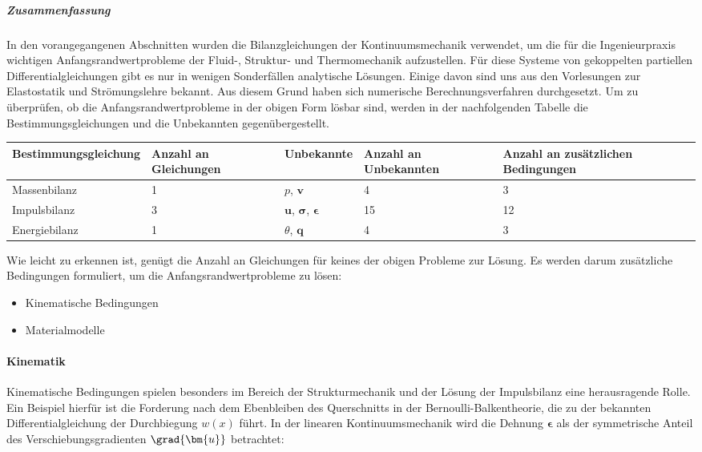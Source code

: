
\subparagraph{Zusammenfassung}

In den vorangegangenen Abschnitten wurden die Bilanzgleichungen der Kontinuumsmechanik verwendet, um die für die Ingenieurpraxis wichtigen Anfangsrandwertprobleme der Fluid-, Struktur- und Thermomechanik aufzustellen. Für diese Systeme von gekoppelten partiellen Differentialgleichungen gibt es nur in wenigen Sonderfällen analytische Lösungen. Einige davon sind uns aus den Vorlesungen zur Elastostatik und Strömungslehre bekannt. Aus diesem Grund haben sich numerische Berechnungsverfahren durchgesetzt. Um zu überprüfen, ob die Anfangsrandwertprobleme in der obigen Form lösbar sind, werden in der nachfolgenden Tabelle die Bestimmungsgleichungen und die Unbekannten gegenübergestellt.

\bigskip\noindent
\begin{tabular}{p{}p{}p{}p{}p{}}
\toprule
Bestimmungsgleichung & Anzahl an Gleichungen & Unbekannte & Anzahl an Unbekannten & Anzahl an zusätzlichen Bedingungen \\
\hline
Massenbilanz & 1 & $p$, $\bm{v}$ & 4 & 3 \\
Impulsbilanz & 3 & $\bm{u}$, $\bm{\sigma}$, $\bm{\epsilon}$ & 15 & 12 \\
Energiebilanz & 1 & $\theta$, $\bm{q}$ & 4 & 3 \\
\bottomrule
\end{tabular}

\bigskip Wie leicht zu erkennen ist, genügt die Anzahl an Gleichungen für keines der obigen Probleme zur Lösung. Es werden darum zusätzliche Bedingungen formuliert, um die Anfangsrandwertprobleme zu lösen:

\begin{itemize}
\item Kinematische Bedingungen
\item Materialmodelle
\end{itemize}


\paragraph{Kinematik}

Kinematische Bedingungen spielen besonders im Bereich der Strukturmechanik und der Lösung der Impulsbilanz eine herausragende Rolle. Ein Beispiel hierfür ist die Forderung nach dem Ebenbleiben des Querschnitts in der Bernoulli-Balkentheorie, die zu der bekannten Differentialgleichung der Durchbiegung $w(x)$ führt.
In der linearen Kontinuumsmechanik wird die Dehnung $\bm{\epsilon}$ als der symmetrische Anteil des Verschiebungsgradienten $\grad{\bm{u}}$ betrachtet:

